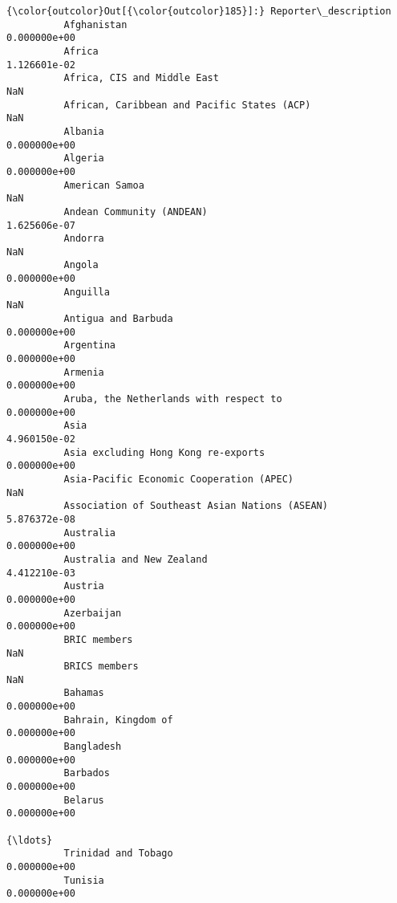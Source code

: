 \documentclass[11pt]{article}
\begin{document}
\begin{Verbatim}[commandchars=\\\{\}]
{\color{outcolor}Out[{\color{outcolor}185}]:} Reporter\_description
          Afghanistan                                         0.000000e+00
          Africa                                              1.126601e-02
          Africa, CIS and Middle East                                  NaN
          African, Caribbean and Pacific States (ACP)                  NaN
          Albania                                             0.000000e+00
          Algeria                                             0.000000e+00
          American Samoa                                               NaN
          Andean Community (ANDEAN)                           1.625606e-07
          Andorra                                                      NaN
          Angola                                              0.000000e+00
          Anguilla                                                     NaN
          Antigua and Barbuda                                 0.000000e+00
          Argentina                                           0.000000e+00
          Armenia                                             0.000000e+00
          Aruba, the Netherlands with respect to              0.000000e+00
          Asia                                                4.960150e-02
          Asia excluding Hong Kong re-exports                 0.000000e+00
          Asia-Pacific Economic Cooperation (APEC)                     NaN
          Association of Southeast Asian Nations (ASEAN)      5.876372e-08
          Australia                                           0.000000e+00
          Australia and New Zealand                           4.412210e-03
          Austria                                             0.000000e+00
          Azerbaijan                                          0.000000e+00
          BRIC members                                                 NaN
          BRICS members                                                NaN
          Bahamas                                             0.000000e+00
          Bahrain, Kingdom of                                 0.000000e+00
          Bangladesh                                          0.000000e+00
          Barbados                                            0.000000e+00
          Belarus                                             0.000000e+00
                                                                  {\ldots}     
          Trinidad and Tobago                                 0.000000e+00
          Tunisia                                             0.000000e+00

\end{Verbatim}
\end{document}

